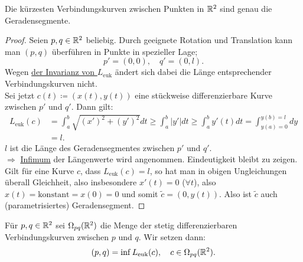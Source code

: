 \begin{lemma}
  \label{lemma:geradenkurz}
  Die kürzesten Verbindungskurven zwischen Punkten in $ \mathbb{R}^2 $ sind genau die Geradensegmente. \\
  \begin{proof}
    Seien $ p, q \in \mathbb{R}^2 $ beliebig. Durch geeignete Rotation und Translation kann man $ (p,q) $ überführen in Punkte in spezieller Lage;
    \begin{equation*}
      p' = (0,0), \quad q' = (0,l)\text{.}
    \end{equation*}
    Wegen \hyperref[lm:leuklinvarianz]{der Invarianz von $ L_\text{euk} $} ändert sich dabei die Länge entsprechender Verbindungskurven nicht. \\
    Sei jetzt $ c(t) \coloneqq (x(t),y(t)) $ eine stückweise differenzierbare Kurve zwischen $ p' $ und $ q' $. Dann gilt:
    \begin{align*}
      L_\text{euk}(c) &= \int_a^b\sqrt{(x')^2+(y')^2}dt \geq \int_a^b\vert y' \vert dt \geq \int_a^by'(t)dt = \int_{y(a) = 0}^{y(b) = l} dy \\
       &= l\text{.}
    \end{align*}
    $ l $ ist die Länge des Geradensegmentes zwischen $ p' $ und $ q' $. \\
    $ \Rightarrow $ \underline{Infimum} der Längenwerte wird angenommen. Eindeutigkeit bleibt zu zeigen. \\
    Gilt für eine Kurve $ c $, dass $ L_\text{euk}(c) = l $, so hat man in obigen Ungleichungen überall Gleichheit, also insbesondere $ x'(t) = 0 $ ($ \forall t $), also $ x(t) = \text{konstant} = x(0) = 0 $ und somit $ \widetilde{c} = (0,y(t)) $. Also ist $ \widetilde{c} $ auch (parametrisiertes) Geradensegment.
  \end{proof}
\end{lemma}

\begin{definition}
  Für $ p,q \in \mathbb{R}^2 $ sei $ \Omega_{pq}(\mathbb{R}^2) $ die Menge der stetig differenzierbaren Verbindungskurven zwischen $ p $ und $ q $. Wir setzen dann:
  \begin{equation*}
    (p,q) = \inf L_\text{euk}(c), \quad c \in \Omega_{pq}(\mathbb{R}^2)\text{.}
  \end{equation*}
\end{definition}

